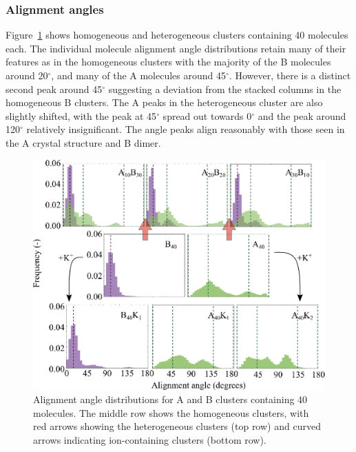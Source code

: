 \subsubsection{Alignment angles}
Figure~\ref{fig:alignmentangles_hetero} shows homogeneous and heterogeneous clusters containing 40 molecules each. The individual molecule alignment angle distributions retain many of their features as in the homogeneous clusters with the majority of the B molecules around 20$^{\circ}$, and many of the A molecules around 45$^{\circ}$.  However, there is a distinct second peak around 45$^{\circ}$ suggesting a deviation from the stacked columns in the homogeneous B clusters. The A peaks in the heterogeneous cluster are also slightly shifted, with the peak at 45$^{\circ}$ spread out towards 0$^{\circ}$ and the peak around 120$^{\circ}$ relatively insignificant.
The angle peaks align reasonably with those seen in the A crystal structure and B dimer. %
%
\begin{figure}[!tbh]
\centering
\includegraphics[width=0.7\linewidth]{Figures/alignment_angles_hetero.eps}
\caption{Alignment angle distributions for A and B clusters containing 40 molecules. The middle row shows the homogeneous clusters, with red arrows showing the heterogeneous clusters (top row) and curved arrows indicating ion-containing clusters (bottom row).}
\label{fig:alignmentangles_hetero}
\end{figure}
%

